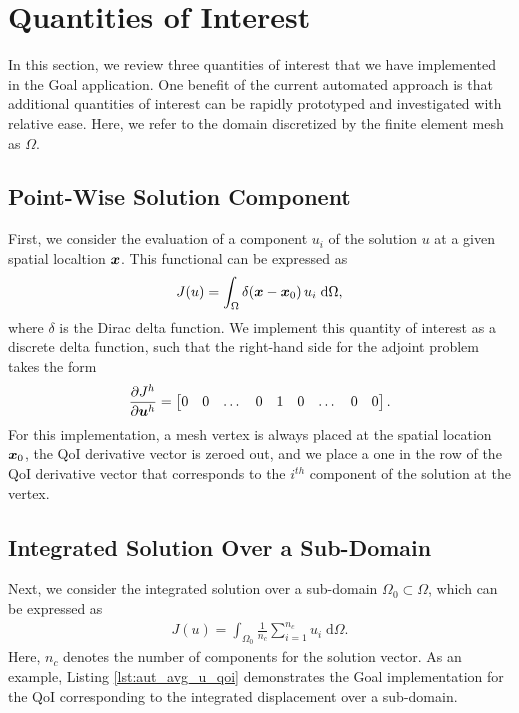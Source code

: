 \section{Quantities of Interest}

In this section, we review three quantities of interest that we have
implemented in the Goal application. One benefit of the current automated
approach is that additional quantities of interest can be rapidly
prototyped and investigated with relative ease. Here, we refer to the
domain discretized by the finite element mesh as $\Omega$.

\subsection{Point-Wise Solution Component}

First, we consider the evaluation of a component $u_i$ of the solution $u$
at a given spatial localtion $\boldsymbol{x}$. This functional can be expressed as
%
\begin{gather}
J(u) = \int_{\Omega} \delta ( \boldsymbol{x} - \boldsymbol{x}_0 ) \, u_i
\; \text{d} \Omega,
\label{eq:aut_pw_qoi}
\end{gather}
%
where $\delta$ is the Dirac delta function. We implement this quantity of
interest as a discrete delta function, such that the right-hand side for
the adjoint problem takes the form
%
\begin{gather}
\frac{\partial J^h}{\partial \boldsymbol{u}^h} =
\begin{bmatrix}
0 & 0 & \dots & 0 & 1 & 0 & \dots & 0 & 0
\end{bmatrix}.
\label{eq:aut_discrete_delta}
\end{gather}
%
For this implementation, a mesh vertex is always placed at the spatial
location $\boldsymbol{x}_0$, the QoI derivative vector is zeroed out, and we place a
one in the row of the QoI derivative vector that corresponds to the $i^{th}$
component of the solution at the vertex.

\subsection{Integrated Solution Over a Sub-Domain}

Next, we consider the integrated solution over a sub-domain
$\Omega_0 \subset \Omega$, which can be expressed as
%
\begin{gather}
J(u) = \int_{\Omega_0} \frac{1}{n_c} \sum_{i=1}^{n_c} u_i
\; \text{d} \Omega.
\label{eq:aut_avg_u_qoi}
\end{gather}
%
Here, $n_c$ denotes the number of components for the solution vector. As an
example, Listing \ref{lst:aut_avg_u_qoi} demonstrates the Goal implementation
for the QoI corresponding to the integrated displacement over a sub-domain.


